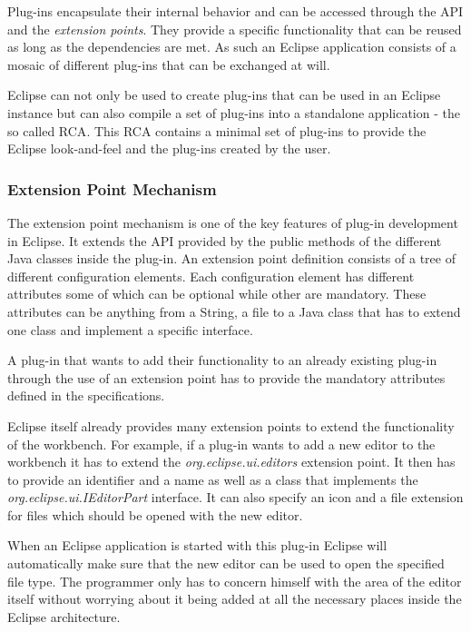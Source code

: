Plug-ins encapsulate their internal behavior and can be accessed through the \ac{API} and the 
\textit{extension points}. They provide a specific functionality that can be reused as long as
the dependencies are met. As such an Eclipse application consists of a mosaic of different
plug-ins that can be exchanged at will.

Eclipse can not only be used to create plug-ins that can be used in an Eclipse
instance but can also compile a set of plug-ins into a standalone application - the so
called \ac{RCA}. This \ac{RCA} contains a minimal set of plug-ins to provide the Eclipse
look-and-feel and the plug-ins created by the user.

\subsubsection{Extension Point Mechanism}
\label{section:ConfTechExtension}
The extension point mechanism is one of the key features of plug-in development in Eclipse.
It extends the \ac{API} provided by the public methods of the different Java classes inside
the plug-in. An extension point definition consists of a tree of different configuration elements.
Each configuration element has different attributes some of which can be optional while other
are mandatory. These attributes can be anything from a String, a file to a Java class that has
to extend one class and implement a specific interface.

A plug-in that wants to add their functionality to an already existing plug-in
through the use of an extension point has to provide the mandatory attributes defined in the 
specifications.

Eclipse itself already provides many extension points to extend the functionality of the workbench.
For example, if a plug-in wants to add a new editor to the workbench it has to extend the 
\textit{org.eclipse.ui.editors} extension point. It then has to provide an identifier and a name
as well as a class that implements the \textit{org.eclipse.ui.IEditorPart} interface. It can also specify an
icon and a file extension for files which should be opened with the new editor.

When an Eclipse application is started with this plug-in Eclipse will automatically make sure that the new editor
can be used to open the specified file type. The programmer only has to concern himself with the area of the editor
itself without worrying about it being added at all the necessary places inside the Eclipse architecture.

